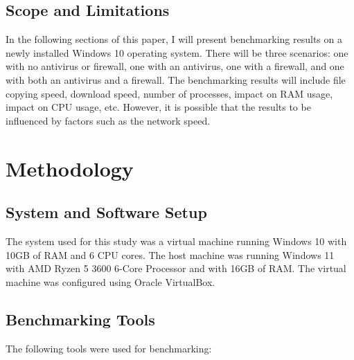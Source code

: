 \documentclass[runningheads,a4paper,english]{llncs}[2022/01/12]
\begin{document}
\subsection{Scope and Limitations}
\label{sec:scope}

\par In the following sections of this paper, I will present benchmarking
results on a newly installed Windows 10 operating system. There will be three
scenarios: one with no antivirus or firewall, one with an antivirus, one with a
firewall, and one with both an antivirus and a firewall. The benchmarking
results will include file copying speed, download speed, number of processes,
impact on RAM usage, impact on CPU usage, etc. However, it is possible that the
results to be influenced by factors such as the network speed.


\section{Methodology}
\label{sec:methodology}

\subsection{System and Software Setup}
\label{sec:setup}

\par The system used for this study was a virtual machine running Windows 10
with 10GB of RAM and 6 CPU cores. The host machine was running Windows 11 with
AMD Ryzen 5 3600 6-Core Processor and with 16GB of RAM\@. The virtual machine
was configured using Oracle VirtualBox\cite{VirtualBox}.

\subsection{Benchmarking Tools}
\label{sec:tools}

\par The following tools were used for benchmarking:
\end{document}

